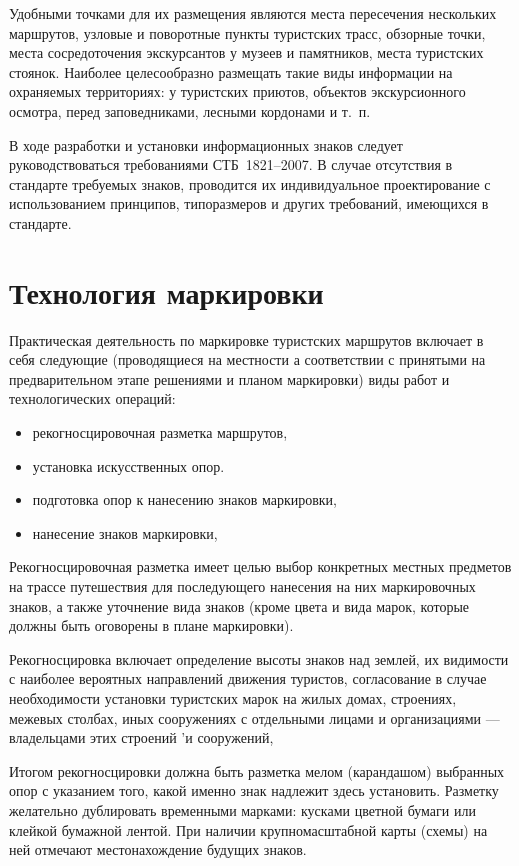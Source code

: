 \documentclass[a4paper,12pt,titlepage]{extarticle}
\begin{document}
Удобными точками для их размещения являются места пересечения нескольких маршрутов, узловые и поворотные пункты
туристских трасс, обзорные точки, места сосредоточения экскурсантов у музеев и памятников, места туристских стоянок.
Наиболее целесообразно размещать такие виды информации на охраняемых территориях: у туристских приютов, объектов
экскурсионного осмотра, перед заповедниками, лесными кордонами и т.~п.

В ходе разработки и установки информационных знаков следует руководствоваться требованиями СТБ~1821--2007. В случае
отсутствия в стандарте требуемых знаков, проводится их индивидуальное проектирование с использованием принципов,
типоразмеров и других требований, имеющихся в стандарте.

\section{Технология маркировки}

Практическая деятельность по маркировке туристских маршрутов включает в себя следующие (проводящиеся на местности а
соответствии с принятыми на предварительном этапе решениями и планом маркировки) виды работ и технологических операций:

\begin{itemize}
	\item рекогносцировочная разметка маршрутов,
	\item установка искусственных опор.
	\item подготовка опор к нанесению знаков маркировки,
	\item нанесение знаков маркировки,
\end{itemize}

Рекогносцировочная разметка имеет целью выбор конкретных местных предметов на трассе путешествия для последующего
нанесения на них маркировочных знаков, а также уточнение вида знаков (кроме цвета и вида марок, которые должны быть
оговорены в плане маркировки).

Рекогносцировка включает определение высоты знаков над землей, их видимости с наиболее вероятных направлений движения
туристов, согласование в случае необходимости установки туристских марок на жилых домах, строениях, межевых столбах,
иных сооружениях с отдельными лицами и организациями --- владельцами этих строений 'и сооружений,

Итогом рекогносцировки должна быть разметка мелом (карандашом) выбранных опор с указанием того, какой именно знак
надлежит здесь установить. Разметку желательно дублировать временными марками: кусками цветной бумаги или клейкой
бумажной лентой. При наличии крупномасштабной карты (схемы) на ней отмечают местонахождение будущих знаков.
\end{document}
